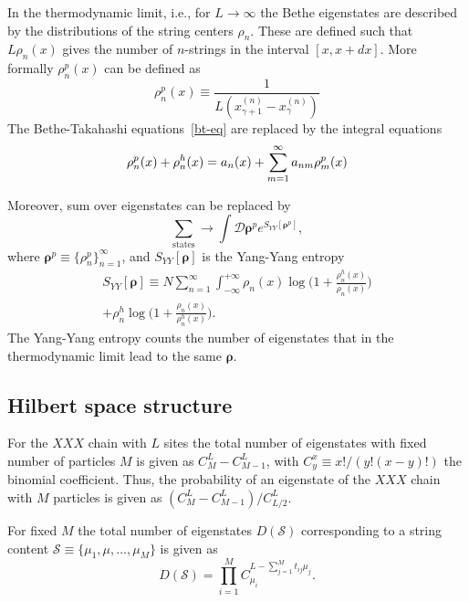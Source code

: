 \documentclass[twocolumn,superscriptaddress,prb,10pt]{revtex4-1}
\begin{document}
In the thermodynamic limit, i.e., for $L\to\infty$ the Bethe eigenstates are 
described by the distributions of the string centers $\rho_n$. 
These are defined such that $L\rho_n(x)$ gives the number of $n$-strings in the 
interval $[x,x+dx]$. More formally $\rho^p_n(x)$ can be defined as 
%
\begin{equation}
\label{rho-n}
\rho^p_n(x)\equiv\frac{1}{L(x_{\gamma+1}^{(n)}-x_\gamma^{(n)})}
\end{equation}
%
The Bethe-Takahashi equations~\eqref{bt-eq} are replaced by the integral 
equations 
%
\begin{equation}
\rho^p_n(x)+\rho_n^h(x)=a_n(x)+\sum\limits_{m=1}^\infty a_{nm}\*\rho^p_m(x)
\end{equation}
%

Moreover, sum over eigenstates can be replaced by 
%
\begin{equation}
\sum\limits_{\textrm{states}}\rightarrow\int{\mathcal D}
\pmb{\rho}^pe^{S_{YY}[\pmb{\rho}^p]},
\end{equation}
%
where $\pmb{\rho}^p\equiv\{\rho^p_n\}_{n=1}^\infty$, and $S_{YY}[\pmb{\rho}]$ 
is the Yang-Yang entropy
%
\begin{multline}
S_{YY}[\pmb{\rho}]\equiv N\sum\limits_{n=1}^\infty\int_{-\infty}^{+\infty}
\rho_n(x)\log\Big(1+\frac{\rho_n^h(x)}{\rho_n(x)}\Big)\\
+\rho_n^h\log\Big(1+\frac{\rho_n(x)}{\rho_n^h(x)}\Big).
\end{multline}
%
The Yang-Yang entropy counts the number of eigenstates that in the 
thermodynamic limit lead to the same $\pmb{\rho}$. 




\subsection{Hilbert space structure}


For the $XXX$ chain with $L$ sites the total number of eigenstates with 
fixed number of particles $M$ is given as $C_M^L-C_{M-1}^L$, with 
$C_y^x\equiv x!/(y!(x-y)!)$ the binomial coefficient. Thus, the probability 
of an eigenstate of the $XXX$ chain with $M$ particles is given as 
$(C_M^L-C_{M-1}^L)/C_{L/2}^L$. 

For fixed $M$ the total number of eigenstates $D({\mathcal S})$ corresponding 
to a string content ${\mathcal S}\equiv\{\mu_1,\mu,\dots,\mu_M\}$ is given as 
%
\begin{equation}
\label{str-prob}
D({\mathcal S})=\prod_{i=1}^MC_{\mu_i}^{L-\sum_{j=1}^M t_{ij}\mu_j}.
\end{equation}
%
\end{document}

